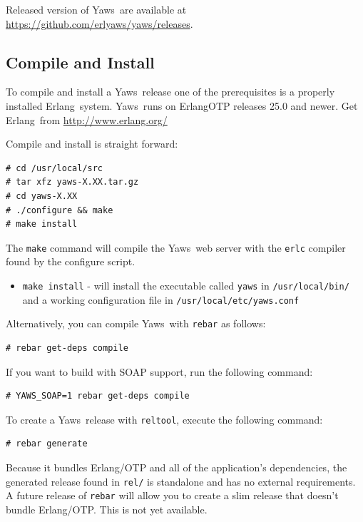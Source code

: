 \documentclass[11pt,oneside,english]{book}
\newcommand{\Erlang}            %
        {{\sc Erlang}}
\newcommand{\Yaws}            %
        {{\sc Yaws}}
\begin{document}
Released version of \Yaws\ are available at
\url{https://github.com/erlyaws/yaws/releases}.

\subsection{Compile and Install}

To compile and install a \Yaws\  release
one of the prerequisites is a properly installed \Erlang\  system. \Yaws\
runs on \Erlang\/OTP releases 25.0 and newer. Get \Erlang\  from
\url{http://www.erlang.org/}

Compile and install is straight forward:
\begin{verbatim}
# cd /usr/local/src
# tar xfz yaws-X.XX.tar.gz
# cd yaws-X.XX
# ./configure && make
# make install
\end{verbatim}

The \verb+make+ command will compile the \Yaws\  web server with the
\verb+erlc+ compiler found by the configure script.

\begin{itemize}

\item  \verb+make install+ - will install the executable called
         \verb+yaws+ in \verb+/usr/local/bin/+ and a working
         configuration file in \verb+/usr/local/etc/yaws.conf+

\end{itemize}

Alternatively, you can compile \Yaws\  with \verb+rebar+ as follows:

\begin{verbatim}
# rebar get-deps compile
\end{verbatim}

If you want to build with SOAP support, run the following command:

\begin{verbatim}
# YAWS_SOAP=1 rebar get-deps compile
\end{verbatim}

To create a \Yaws\  release with \verb+reltool+, execute the following
command:

\begin{verbatim}
# rebar generate
\end{verbatim}

Because it bundles Erlang/OTP and all of the application's dependencies,
the generated release found in \verb+rel/+ is standalone and has no
external requirements. A future release of \verb+rebar+ will allow you
to create a slim release that doesn't bundle Erlang/OTP. This is not yet
available.
\end{document}
